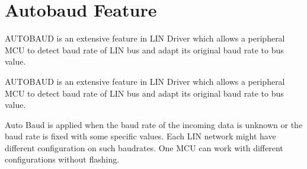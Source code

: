 \hypertarget{group__autobaud__group}{}\section{Autobaud Feature}
\label{group__autobaud__group}


A\+U\+T\+O\+B\+A\+U\+D is an extensive feature in L\+I\+N Driver which allows a peripheral M\+C\+U to detect baud rate of L\+I\+N bus and adapt its original baud rate to bus value.  


A\+U\+T\+O\+B\+A\+U\+D is an extensive feature in L\+I\+N Driver which allows a peripheral M\+C\+U to detect baud rate of L\+I\+N bus and adapt its original baud rate to bus value. 

Auto Baud is applied when the baud rate of the incoming data is unknown or the baud rate is fixed with some specific values. Each L\+I\+N network might have different configuration on such baudrates. One M\+C\+U can work with different configurations without flashing. 